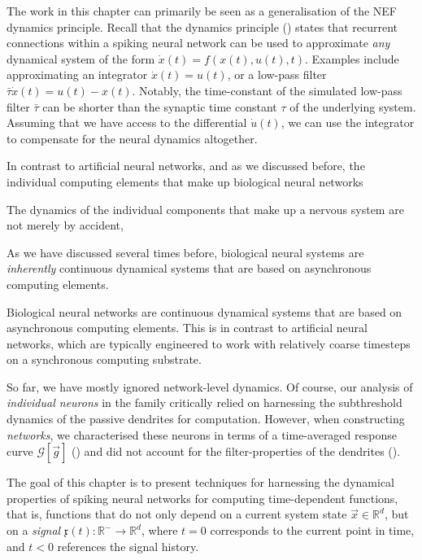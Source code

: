 The work in this chapter can primarily be seen as a generalisation of the NEF dynamics principle.
Recall that the dynamics principle () states that recurrent connections within a spiking neural network can be used to approximate \emph{any} dynamical system of the form $\dot{x}(t) = f(x(t), u(t), t)$.
Examples include approximating an integrator $\dot{x}(t) = u(t)$, or a low-pass filter $\bar \tau \dot{x}(t) = u(t) - x(t)$.
Notably, the time-constant of the simulated low-pass filter $\bar \tau$ can be shorter than the synaptic time constant $\tau$ of the underlying system.
Assuming that we have access to the differential $\dot u(t)$, we can use the integrator to compensate for the neural dynamics altogether.

In contrast to artificial neural networks, and as we discussed before, the individual computing elements that make up biological neural networks 

The dynamics of the individual components that make up a nervous system are not merely by accident, 


As we have discussed several times before, biological neural systems are \emph{inherently} continuous dynamical systems that are based on asynchronous computing elements.

Biological neural networks are continuous dynamical systems that are based on asynchronous computing elements.
This is in contrast to artificial neural networks, which are typically engineered to work with relatively coarse timesteps on a synchronous computing substrate.

So far, we have mostly ignored network-level dynamics.
Of course, our analysis of \emph{individual neurons} in the \nlif family critically relied on harnessing the subthreshold dynamics of the passive dendrites for computation.
However, when constructing \emph{networks}, we characterised these neurons in terms of a time-averaged response curve $\mathscr{G}[\vec g]$ () and did not account for the filter-properties of the dendrites ().

The goal of this chapter is to present techniques for harnessing the dynamical properties of spiking neural networks for computing time-dependent functions, that is, functions that do not only depend on a current system state $\vec x \in \mathbb{R}^d$, but on a \emph{signal} $\mathfrak{x}(t) : \mathbb{R}^- \longrightarrow \mathbb{R}^d$, where $t = 0$ corresponds to the current point in time, and $t < 0$ references the signal history.

